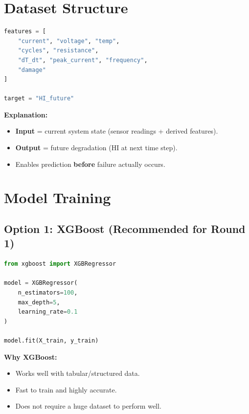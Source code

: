 \documentclass[12pt]{article}
\begin{document}
\section{Dataset Structure}

\begin{lstlisting}[language=Python]
features = [
    "current", "voltage", "temp",
    "cycles", "resistance",
    "dT_dt", "peak_current", "frequency",
    "damage"
]

target = "HI_future"
\end{lstlisting}

\textbf{Explanation:}
\begin{itemize}
  \item \textbf{Input} = current system state (sensor readings + derived features).
  \item \textbf{Output} = future degradation (HI at next time step).
  \item Enables prediction \textbf{before} failure actually occurs.
\end{itemize}


\section{Model Training}

\subsection{Option 1: XGBoost (Recommended for Round 1)}

\begin{lstlisting}[language=Python]
from xgboost import XGBRegressor

model = XGBRegressor(
    n_estimators=100,
    max_depth=5,
    learning_rate=0.1
)

model.fit(X_train, y_train)
\end{lstlisting}

\textbf{Why XGBoost:}
\begin{itemize}
  \item Works well with tabular/structured data.
  \item Fast to train and highly accurate.
  \item Does not require a huge dataset to perform well.
\end{itemize}

\end{document}
